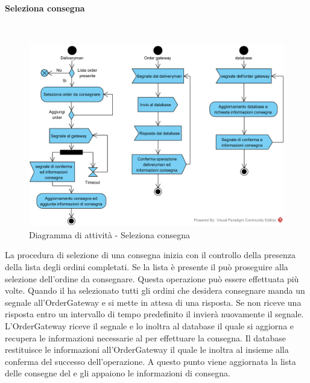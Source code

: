 \paragraph{Seleziona consegna}\mbox{}\\
\nopagebreak
\begin{figure}[H]
	\centering
	\includegraphics[width=14cm]{diagrammi_img/attivita/deliveryman_seleziona.png}
	\caption{Diagramma di attività - Seleziona consegna}
\end{figure}
La procedura di selezione di una consegna inizia con il controllo della presenza della lista degli ordini completati. Se la lista è presente il \Deliveryman{} può proseguire alla selezione dell'ordine da consegnare. Questa operazione può essere effettuata più volte. Quando il \Deliverymna{} ha selezionato tutti gli ordini che desidera consegnare manda un segnale all'OrderGateway e si mette in attesa di una risposta. Se non riceve una risposta entro un intervallo di tempo predefinito il \Deliveryman{} invierà nuovamente il segnale. L'OrderGateway riceve il segnale e lo inoltra al database il quale si aggiorna e recupera le informazioni necessarie al \Deliveryman{} per effettuare la consegna. Il database restituisce le informazioni all'OrderGateway il quale le inoltra al \Deliveryman{} insieme alla conferma del successo dell'operazione. A questo punto viene aggiornata la lista delle consegne del \Deliveryman{} e gli appaiono le informazioni di consegna.

